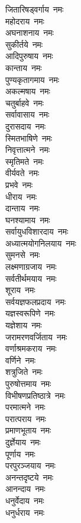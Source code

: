 \begin{multicols}{2}
\begin{flushleft}
जितारिषड्वर्गाय~नमः\\
महोदराय~नमः\hfill{}\\
अघनाशनाय~नमः\\
सुकीर्तये~नमः\\
आदिपुरुषाय~नमः\\
कान्ताय~नमः\\
पुण्यकृतागमाय~नमः\\
अकल्मषाय~नमः\\
चतुर्बाहवे~नमः\\
सर्वावासाय~नमः\\
दुरासदाय~नमः\\
स्मितभाषिणे~नमः\hfill{}\\
निवृत्तात्मने~नमः\\
स्मृतिमते~नमः\\
वीर्यवते~नमः\\
प्रभवे~नमः\\
धीराय~नमः\\
दान्ताय~नमः\\
घनश्यामाय~नमः\\
सर्वायुधविशारदाय~नमः\\
अध्यात्मयोगनिलयाय~नमः\\
सुमनसे~नमः\hfill{}\\
लक्ष्मणाग्रजाय~नमः\\
सर्वतीर्थमयाय~नमः\\
शूराय~नमः\\
सर्वयज्ञफलप्रदाय~नमः\\
यज्ञस्वरूपिणे~नमः\\
यज्ञेशाय~नमः\\
जरामरणवर्जिताय~नमः\\
वर्णाश्रमकराय~नमः\\
वर्णिने~नमः\\
शत्रुजिते~नमः\hfill{}\\
पुरुषोत्तमाय~नमः\\
विभीषणप्रतिष्ठात्रे~नमः\\
परमात्मने~नमः\\
परात्पराय~नमः\\
प्रमाणभूताय~नमः\\
दुर्ज्ञेयाय~नमः\\
पूर्णाय~नमः\\
परपुरञ्जयाय~नमः\\
अनन्तदृष्टये~नमः\\
आनन्दाय~नमः\hfill{}\\
धनुर्वेदाय~नमः\\
धनुर्धराय~नमः\\

\end{flushleft}
\end{multicols}
